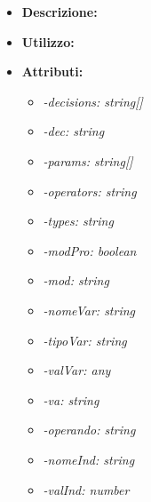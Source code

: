 \begin{itemize}
	\item \textbf{Descrizione:}\\
	
	\item \textbf{Utilizzo:}\\
	
	\item \textbf{Attributi:}
		\begin{itemize}
			\item \emph{-decisions: string[]}\\
			
			\item \emph{-dec: string}\\
			
			\item \emph{-params: string[]}\\
			
			\item \emph{-operators: string}\\
			
			\item \emph{-types: string}\\
			
			\item \emph{-modPro: boolean}\\
			
			\item \emph{-mod: string}\\
			
			\item \emph{-nomeVar: string}\\
			
			\item \emph{-tipoVar: string}\\
			
			\item \emph{-valVar: any}\\
			
			\item \emph{-va: string}\\
			
			\item \emph{-operando: string}\\
			
			\item \emph{-nomeInd: string}\\
			
			\item \emph{-valInd: number}\\
			

\end{itemize}
\end{itemize}
